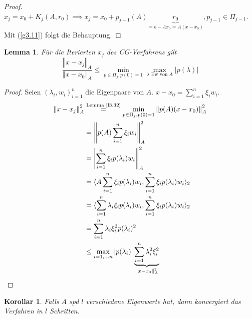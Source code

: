 \documentclass{book}
\newtheorem{corollary}[algorithm]{Korollar}
\newtheorem{lemma}[algorithm]{Lemma}
\begin{document}
            \begin{proof}
                $x_j=x_0+K_j(A,r_0)\implies x_j=x_0+p_{j-1}(A)\underbrace{r_0}_{=b-Ax_0=A(x-x_0)},p_{j-1}\in\Pi_{j-1}$.
                Mit (\ref{g3.11}) folgt die Behauptung.
            \end{proof}

            \begin{lemma}\label{l3.33}
                Für die Iterierten $x_j$ des CG-Verfahrens gilt 
                \begin{equation}\label{g3.12}
                    \frac{\left\Vert x-x_j \right\Vert_A}{\left\Vert x-x_0 \right\Vert_A}\leq \min_{p\in\Pi_j,p(0)=1} \max_{\lambda \text{ Ew von } A} \left\vert p(\lambda) \right\vert
                \end{equation}
            \end{lemma}

            \begin{proof}
                Seien $(\lambda_i,w_i)_{i=1}^n$ die Eigenpaare von $A$. $x-x_0=\sum_{i=1}^n\xi_i w_i$.
                \begin{align*}
                    \left\Vert x-x_j \right\Vert_A^2 &\stackrel{\text{Lemma \ref{l3.32}}}{=}\min_{p\in\Pi_j, p(0)=1}\left\Vert p(A)(x-x_0) \right\Vert_A^2\\
                    &=\left\Vert p(A)\sum_{i=1}^n \xi_i w_i\right\Vert_A^2\\
                    &=\left\vert\sum_{i=1}^n \xi_i p(\lambda_i)w_i\right\Vert_A^2\\
                    &= \langle A\sum_{i=1}^n \xi_ip(\lambda_i)w_i,\sum_{i=1}^n \xi_ip(\lambda_i)w_i \rangle_2\\
                    &=\langle \sum_{i=1}^n \lambda_i\xi_ip(\lambda_i)w_i,\sum_{i=1}^n \xi_ip(\lambda_i)w_i \rangle_2\\
                    &=\sum_{i=1}^n \lambda_i \xi_i^2 p(\lambda_i)^2\\ 
                    &\leq \max_{i=1,\dots n} \left\vert p(\lambda_i) \right\vert \underbrace{\sum_{i=1}^n\lambda_i^2\xi_i^2}_{\left\Vert x-x_0 \right\Vert_A^2}
                \end{align*}
            
            \end{proof}

            \begin{corollary}\label{k3.34}
                Falls $A$ spd $l$ verschiedene Eigenwerte hat, dann konvergiert das Verfahren in $l$ Schritten.
            \end{corollary}
\end{document}
